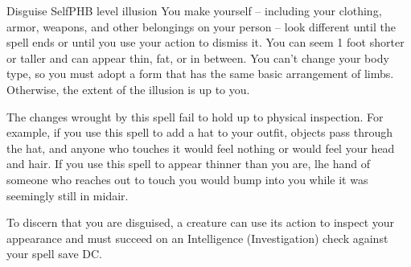 \begin{spell}{Disguise Self}{PHB}{ level illusion}
{
}
You make yourself -- including your clothing, armor,
weapons, and other belongings on your person -- look
different until the spell ends or until you use your action
to dismiss it. You can seem 1 foot shorter or taller and
can appear thin, fat, or in between. You can't change
your body type, so you must adopt a form that has the
same basic arrangement of limbs. Otherwise, the extent
of the illusion is up to you.

The changes wrought by this spell fail to hold up to
physical inspection. For example, if you use this spell
to add a hat to your outfit, objects pass through the hat,
and anyone who touches it would feel nothing or would
feel your head and hair. If you use this spell to appear
thinner than you are, lhe hand of someone who reaches
out to touch you would bump into you while it was
seemingly still in midair.

To discern that you are disguised, a creature can use
its action to inspect your appearance and must succeed
on an Intelligence (Investigation) check against your
spell save DC.
\end{spell}